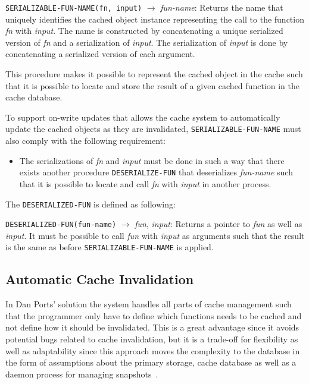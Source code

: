 \verb$SERIALIZABLE-FUN-NAME(fn, input)$ $\rightarrow$ \emph{fun-name}: Returns the name that uniquely identifies the cached object instance representing the call to the function \emph{fn} with \emph{input}. The name is constructed by concatenating a unique serialized version of \emph{fn} and a serialization of \emph{input}. The serialization of \emph{input} is done by concatenating a serialized version of each argument.

This procedure makes it possible to represent the cached object in the cache such that it is possible to locate and store the result of a given cached function in the cache database.

To support on-write updates that allows the cache system to automatically update the cached objects as they are invalidated, \verb$SERIALIZABLE-FUN-NAME$ must also comply with the following requirement:

\begin{itemize}
  \item The serializations of \emph{fn} and \emph{input} must be done in such a way that there exists another procedure \verb$DESERIALIZE-FUN$ that deserializes \emph{fun-name} such that it is possible to locate and call \emph{fn} with \emph{input} in another process.
\end{itemize}

The \verb$DESERIALIZED-FUN$ is defined as following:

\verb$DESERIALIZED-FUN(fun-name)$ $\rightarrow$ \emph{fun}, \emph{input}: Returns a pointer to \emph{fun} as well as \emph{input}. It must be possible to call \emph{fun} with \emph{input} as arguments such that the result is the same as before \verb$SERIALIZABLE-FUN-NAME$ is applied.


\subsection{Automatic Cache Invalidation}
\label{subsec:automatic_cache_invalidation}

In Dan Ports' solution the system handles all parts of cache management such that the programmer only have to define which functions needs to be cached and not define how it should be invalidated. This is a great advantage since it avoids potential bugs related to cache invalidation, but it is a trade-off for flexibility as well as adaptability since this approach moves the complexity to the database in the form of assumptions about the primary storage, cache database as well as a daemon process for managing snapshots~\cite{paper:liskov}.

